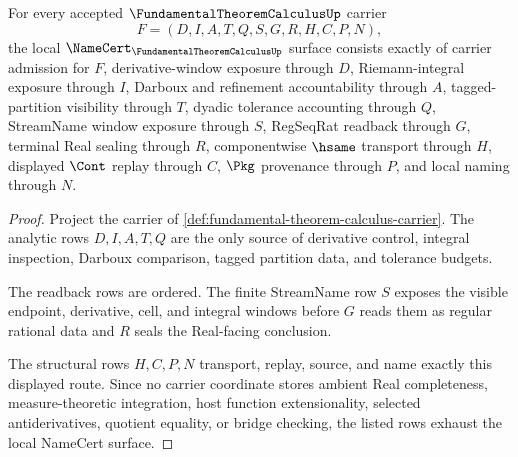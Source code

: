 \begin{theorem}
\label{thm:fundamental-theorem-calculus-namecert-obligations}
For every accepted $\FundamentalTheoremCalculusUp$ carrier
$$
F=(D,I,A,T,Q,S,G,R,H,C,P,N),
$$
the local $\NameCert_{\FundamentalTheoremCalculusUp}$ surface consists exactly of carrier admission for $F$, derivative-window exposure through $D$, Riemann-integral exposure through $I$, Darboux and refinement accountability through $A$, tagged-partition visibility through $T$, dyadic tolerance accounting through $Q$, StreamName window exposure through $S$, RegSeqRat readback through $G$, terminal Real sealing through $R$, componentwise $\hsame$ transport through $H$, displayed $\Cont$ replay through $C$, $\Pkg$ provenance through $P$, and local naming through $N$.
\end{theorem}
\begin{proof}
Project the carrier of \autoref{def:fundamental-theorem-calculus-carrier}. The analytic rows $D,I,A,T,Q$ are the only source of derivative control, integral inspection, Darboux comparison, tagged partition data, and tolerance budgets.

The readback rows are ordered. The finite StreamName row $S$ exposes the visible endpoint, derivative, cell, and integral windows before $G$ reads them as regular rational data and $R$ seals the Real-facing conclusion.

The structural rows $H,C,P,N$ transport, replay, source, and name exactly this displayed route. Since no carrier coordinate stores ambient Real completeness, measure-theoretic integration, host function extensionality, selected antiderivatives, quotient equality, or bridge checking, the listed rows exhaust the local NameCert surface.
\end{proof}

